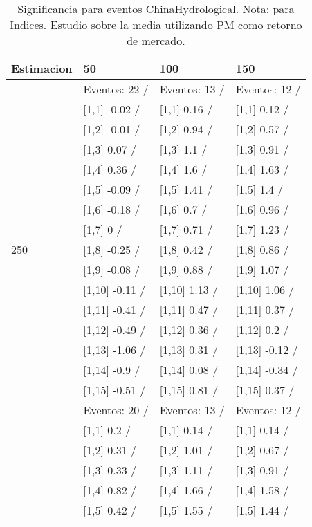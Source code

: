 \begin{table}

\caption{Significancia para eventos ChinaHydrological. Nota: para Indices. Estudio sobre la media utilizando PM como retorno de mercado.}
\centering
\begin{tabular}[t]{llll}
\toprule
Estimacion & 50 & 100 & 150\\
\midrule
 & Eventos:  22 / & Eventos:  13 / & Eventos:  12 /\\
 & {}[1,1] -0.02  / & {}[1,1] 0.16  / & {}[1,1] 0.12  /\\
 & {}[1,2] -0.01  / & {}[1,2] 0.94  / & {}[1,2] 0.57  /\\
 & {}[1,3] 0.07  / & {}[1,3] 1.1  / & {}[1,3] 0.91  /\\
 & {}[1,4] 0.36  / & {}[1,4] 1.6  / & {}[1,4] 1.63  /\\
\addlinespace
 & {}[1,5] -0.09  / & {}[1,5] 1.41  / & {}[1,5] 1.4  /\\
 & {}[1,6] -0.18  / & {}[1,6] 0.7  / & {}[1,6] 0.96  /\\
 & {}[1,7] 0  / & {}[1,7] 0.71  / & {}[1,7] 1.23  /\\
250 & {}[1,8] -0.25  / & {}[1,8] 0.42  / & {}[1,8] 0.86  /\\
 & {}[1,9] -0.08  / & {}[1,9] 0.88  / & {}[1,9] 1.07  /\\
\addlinespace
 & {}[1,10] -0.11  / & {}[1,10] 1.13  / & {}[1,10] 1.06  /\\
 & {}[1,11] -0.41  / & {}[1,11] 0.47  / & {}[1,11] 0.37  /\\
 & {}[1,12] -0.49  / & {}[1,12] 0.36  / & {}[1,12] 0.2  /\\
 & {}[1,13] -1.06  / & {}[1,13] 0.31  / & {}[1,13] -0.12  /\\
 & {}[1,14] -0.9  / & {}[1,14] 0.08  / & {}[1,14] -0.34  /\\
\addlinespace
 & {}[1,15] -0.51  / & {}[1,15] 0.81  / & {}[1,15] 0.37  /\\
 & Eventos:  20 / & Eventos:  13 / & Eventos:  12 /\\
 & {}[1,1] 0.2  / & {}[1,1] 0.14  / & {}[1,1] 0.14  /\\
 & {}[1,2] 0.31  / & {}[1,2] 1.01  / & {}[1,2] 0.67  /\\
 & {}[1,3] 0.33  / & {}[1,3] 1.11  / & {}[1,3] 0.91  /\\
\addlinespace
 & {}[1,4] 0.82  / & {}[1,4] 1.66  / & {}[1,4] 1.58  /\\
 & {}[1,5] 0.42  / & {}[1,5] 1.55  / & {}[1,5] 1.44  /\\

\end{tabular}
\end{table}
